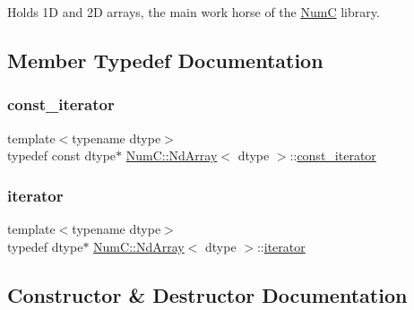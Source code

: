 Holds 1D and 2D arrays, the main work horse of the \mbox{\hyperlink{namespace_num_c}{NumC}} library. 

\subsection{Member Typedef Documentation}
\mbox{\label{class_num_c_1_1_nd_array_a445cec326684b0066bddae07ba06eddf}} 
\subsubsection{\texorpdfstring{const\+\_\+iterator}{const\_iterator}}
{\footnotesize\ttfamily template$<$typename dtype$>$ \\
typedef const dtype$\ast$ \mbox{\hyperlink{class_num_c_1_1_nd_array}{Num\+C\+::\+Nd\+Array}}$<$ dtype $>$\+::\mbox{\hyperlink{class_num_c_1_1_nd_array_a445cec326684b0066bddae07ba06eddf}{const\+\_\+iterator}}}

\mbox{\label{class_num_c_1_1_nd_array_a49cd61f019d7106a40ffdb9c3ee98f08}} 
\subsubsection{\texorpdfstring{iterator}{iterator}}
{\footnotesize\ttfamily template$<$typename dtype$>$ \\
typedef dtype$\ast$ \mbox{\hyperlink{class_num_c_1_1_nd_array}{Num\+C\+::\+Nd\+Array}}$<$ dtype $>$\+::\mbox{\hyperlink{class_num_c_1_1_nd_array_a49cd61f019d7106a40ffdb9c3ee98f08}{iterator}}}



\subsection{Constructor \& Destructor Documentation}
\mbox{\label{class_num_c_1_1_nd_array_a4c4327e80cf320d9e634462e3f58b7b5}} 
